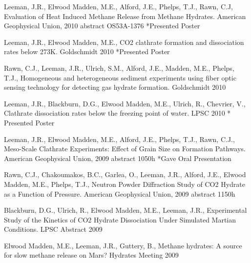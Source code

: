\documentclass[letterpaper]{article}
\renewenvironment{itemize}{
  \begin{list}{}{
    \setlength{\leftmargin}{1.5em}
  }
}{
  \end{list}
}
\begin{document}
\begin{itemize}
\item Leeman, J.R., Elwood Madden, M.E., Alford, J.E., Phelps, T.J., Rawn, C.J, Evaluation of Heat Induced Methane Release from Methane Hydrates. American Geophysical Union, 2010 abstract OS53A-1376 *Presented Poster

\item Leeman, J.R., Elwood Madden, M.E., CO2 clathrate formation and dissociation rates below 273K. Goldschmidt 2010 *Presented Poster

\item Rawn, C.J., Leeman, J.R., Ulrich, S.M., Alford, J.E., Madden, M.E., Phelps, T.J., Homogeneous and heterogeneous sediment experiments using fiber optic sensing technology for detecting gas hydrate formation. Goldschmidt 2010

\item Leeman, J.R., Blackburn, D.G., Elwood Madden, M.E., Ulrich, R., Chevrier, V., Clathrate dissociation rates below the freezing point of water. LPSC 2010 * Presented Poster

\item Leeman, J.R., Elwood Madden, M.E., Alford, J.E., Phelps, T.J., Rawn, C.J., Meso-Scale Clathrate Experiments: Effect of Grain Size on Formation Pathways. American Geophysical Union, 2009 abstract 1050h *Gave Oral Presentation

\item Rawn, C.J., Chakoumakos, B.C., Garlea, O., Leeman, J.R., Alford, J.E., Elwood Madden, M.E., Phelps, T.J., Neutron Powder Diffraction Study of CO2 Hydrate as a Function of Pressure. American Geophysical Union, 2009 abstract 1150h

\item Blackburn, D.G., Ulrich, R., Elwood Madden, M.E., Leeman, J.R., Experimental Study of the Kinetics of CO2 Hydrate Dissociation Under Simulated Martian Conditions. LPSC Abstract 2009

\item Elwood Madden, M.E., Leeman, J.R., Guttery, B., Methane hydrates: A source for slow methane release on Mars? Hydrates Meeting 2009

\end{itemize}
\end{document}
